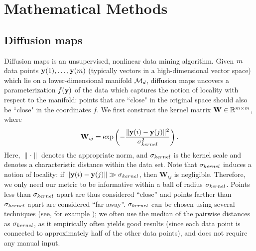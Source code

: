
\chapter{Mathematical Methods}\label{ch:math}

\section{Diffusion maps} \label{sec:dmaps}

Diffusion maps is an unsupervised, nonlinear data mining algorithm. 
%
Given $m$ data points $\mathbf{y}(1), \dots, \mathbf{y}(m)$ (typically vectors in a high-dimensional vector space) which lie on a lower-dimensional manifold $\mathcal{M}_d$, diffusion maps uncovers a parameterization $f(\mathbf{y})$ of the data which captures the notion of locality with respect to the manifold: points that are ``close" in the original space should also be ``close" in the coordinates $f$.
%
%
%
We first construct the kernel matrix $\mathbf{W} \in \mathbb{R}^{m \times m}$, where
\begin{equation} \label{eq:dmaps_kernel}
\mathbf{W}_{ij} = \exp \left( -\frac{\|\mathbf{y}(i) - \mathbf{y}(j) \|^2}{\sigma_{kernel}^2} \right).
\end{equation}
Here, $\| \cdot \|$ denotes the appropriate norm, and $\sigma_{kernel}$ is the kernel scale
and denotes a characteristic distance within the data set.
%
Note that $\sigma_{kernel}$ induces a notion of locality: if $\|\mathbf{y}(i) - \mathbf{y}(j) \| \gg \sigma_{kernel}$, then $\mathbf{W}_{ij}$ is negligible.
%
Therefore, we only need our metric to be informative within a ball of radius $\sigma_{kernel}$.
%
Points less than $\sigma_{kernel}$ apart are thus considered ``close'' and points farther than $\sigma_{kernel}$ apart are considered ``far away''.
%
$\sigma_{kernel}$ can be chosen using several techniques (see, for example \citep{coifman2008graph, rohrdanz2011determination}); 
we often use the median of the pairwise distances as $\sigma_{kernel}$, as it empirically often yields good results (since each data point is connected to approximately half of the other data points), and does not require any manual input. 


